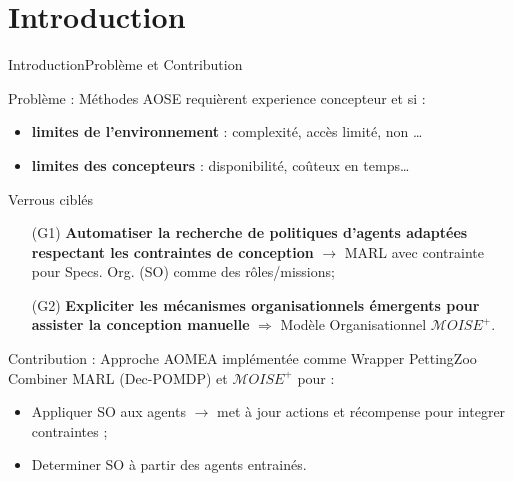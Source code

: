 

\addtocounter{framenumber}{-1}

\section{Introduction}

\begin{frame}{Introduction}{Problème et Contribution}


    \begin{alertblock}{Problème : Méthodes AOSE requièrent experience concepteur et  si :}
        \begin{itemize}
            \item \textbf{limites de l'environnement} : complexité, accès limité, non \dots
            \item \textbf{limites des concepteurs} : disponibilité, coûteux en temps\dots
        \end{itemize}
    \end{alertblock}

    \begin{block}{Verrous ciblés}
        \begin{enumerate}
            \item[\phantom{X} (G1)] \textbf{Automatiser la recherche de politiques d'agents adaptées respectant les contraintes de conception} $\rightarrow$ MARL avec contrainte pour Specs. Org. (SO) comme des rôles/missions;
            \item[\phantom{X} (G2)] \textbf{Expliciter les mécanismes organisationnels émergents pour assister la conception manuelle} $\Longrightarrow$ Modèle Organisationnel $\mathcal{M}OISE^+$.
        \end{enumerate}
    \end{block}

    \begin{exampleblock}{Contribution : Approche AOMEA implémentée comme Wrapper PettingZoo}
        Combiner MARL (Dec-POMDP) et $\mathcal{M}OISE^+$ pour :
        \begin{itemize}
            \item Appliquer SO aux agents $\rightarrow$ met à jour actions et récompense pour integrer contraintes ;
            \item Determiner SO  à partir des agents entrainés.
        \end{itemize}
    \end{exampleblock}

\end{frame}

